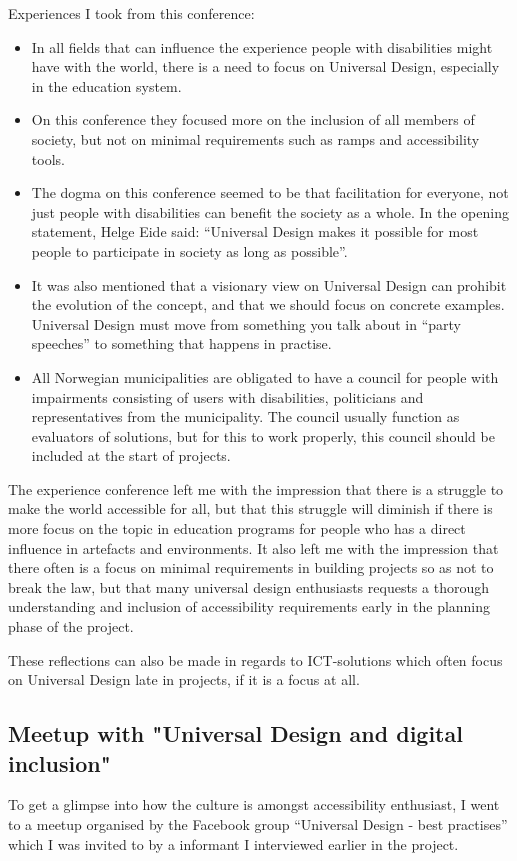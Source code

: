 Experiences I took from this conference:
\begin{itemize}
\item In all fields that can influence the experience people with disabilities might have with the world, there is a need to focus on Universal Design, especially in the education system.
\item On this conference they focused more on the inclusion of all members of society, but not on minimal requirements such as ramps and accessibility tools. 
\item The dogma on this conference seemed to be that facilitation for everyone, not just people with disabilities can benefit the society as a whole. In the opening statement, Helge Eide said: “Universal Design makes it possible for most people to participate in society as long as possible”. 
\item It was also mentioned that a visionary view on Universal Design can prohibit the evolution of the concept, and that we should focus on concrete examples. Universal Design must move from something you talk about in “party speeches” to something that happens in practise.
\item All Norwegian municipalities are obligated to have a council for people with impairments consisting of users with disabilities, politicians and representatives from the municipality. The council usually function as evaluators of solutions, but for this to work properly, this council should be included at the start of projects. 
\end{itemize}

The experience conference left me with the impression that there is a struggle to make the world accessible for all, but that this struggle will diminish if there is more focus on the topic in education programs for people who has a direct influence in artefacts and environments. It also left me with the impression that there often is a focus on minimal requirements in building projects so as not to break the law, but that many universal design enthusiasts requests a thorough understanding and inclusion of accessibility requirements early in the planning phase of the project.

These reflections can also be made in regards to ICT-solutions which often focus on Universal Design late in projects, if it is a focus at all. 

\subsection{Meetup with "Universal Design and digital inclusion"}
To get a glimpse into how the culture is amongst accessibility enthusiast, I went to a meetup organised by the Facebook group “Universal Design - best practises” which I was invited to by a informant I interviewed earlier in the project. 



